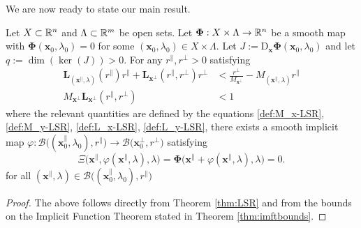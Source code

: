 \documentclass[letterpaper, 10 pt, conference, dvipsnames]{ieeeconf}
\begin{document}
We are now ready to state our main result.

\thm\label{thm:LSRbounds} Let \(X\subset\R[n]\) and \(\Lambda\subset\R[m]\) be open sets. Let \(\boldsymbol{\Phi}:X\times\Lambda\to\R[n]\) be a smooth map with \(\boldsymbol{\Phi}(\mathbf{x}_0,\lambda_0) = 0\) for some \((\mathbf{x}_0,\lambda_0)\in X\times\Lambda\). Let \(J := \mathrm{D}_\mathbf{x}\boldsymbol{\Phi}(\mathbf{x}_0,\lambda_0)\) and let \(q := \dim(\ker(J)) > 0\). For any \(r^\parallel,r^\perp>0\) satisfying
\begin{align*}
    \mathbf{L}_{(\mathbf{x}^\parallel,\lambda)}(r^\parallel)r^\parallel+\mathbf{L}_{\mathbf{x}^\perp}(r^\parallel,r^\perp)r^\perp & < \frac{r^\perp}{M_{\mathbf{x}^\perp}}-M_{(\mathbf{x}^\parallel,\lambda)}r^\parallel \\
    M_{\mathbf{x}^\perp}\mathbf{L}_{\mathbf{x}^\perp}(r^\parallel,r^\perp)                                                        & < 1
\end{align*}
where the relevant quantities are defined by the equations \eqref{def:M_x-LSR}, \eqref{def:M_y-LSR}, \eqref{def:L_x-LSR}, \eqref{def:L_y-LSR}, there exists a smooth implicit map \(\varphi:\mathcal{B}\big((\mathbf{x}^\parallel_0,\lambda_0),r^\parallel\big)\to\mathcal{B}\big(\mathbf{x}^\perp_0,r^\perp\big)\)
satisfying
\begin{equation*}
    \Xi\big(\mathbf{x}^\parallel,\varphi(\mathbf{x}^\parallel,\lambda),\lambda\big) = \boldsymbol{\Phi}\big(\mathbf{x}^\parallel+\varphi(\mathbf{x}^\parallel,\lambda),\lambda\big) = 0.
\end{equation*}
for all \((\mathbf{x}^\parallel,\lambda)\in\mathcal{B}\big((\mathbf{x}^\parallel_0,\lambda_0),r^\parallel\big)\)

\begin{proof}
    The above follows directly from Theorem \ref{thm:LSR} and from the bounds on the Implicit Function Theorem stated in Theorem \ref{thm:imftbounds}.
\end{proof}
\end{document}
